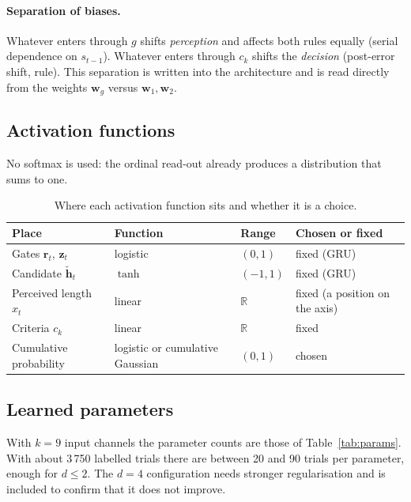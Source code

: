 \documentclass[11pt,a4paper]{article}
\newcommand{\vect}[1]{\bm{#1}}
\begin{document}
\paragraph{Separation of biases.} Whatever enters through $g$ shifts \emph{perception}
and affects both rules equally (serial dependence on $s_{t-1}$). Whatever enters
through $c_k$ shifts the \emph{decision} (post-error shift, rule). This separation is
written into the architecture and is read directly from the weights $\vect{w}_g$
versus $\vect{w}_1, \vect{w}_2$.

\subsection{Activation functions}

No softmax is used: the ordinal read-out already produces a distribution that sums to
one.

\begin{table}[H]
  \centering\small
  \caption{Where each activation function sits and whether it is a choice.}
  \begin{tabular}{llll}
    \toprule
    Place & Function & Range & Chosen or fixed \\
    \midrule
    Gates $\vect{r}_t$, $\vect{z}_t$ & logistic & $(0,1)$ & fixed (GRU) \\
    Candidate $\tilde{\vect{h}}_t$ & $\tanh$ & $(-1,1)$ & fixed (GRU) \\
    Perceived length $\hat x_t$ & linear & $\mathbb{R}$ & fixed (a position on the axis) \\
    Criteria $c_k$ & linear & $\mathbb{R}$ & fixed \\
    Cumulative probability & logistic or cumulative Gaussian & $(0,1)$ & chosen \\
    \bottomrule
  \end{tabular}
\end{table}

\subsection{Learned parameters}

With $k = 9$ input channels the parameter counts are those of
Table~\ref{tab:params}. With about 3\,750 labelled trials there are between 20 and 90
trials per parameter, enough for $d \le 2$. The $d = 4$ configuration needs stronger
regularisation and is included to confirm that it does not improve.
\end{document}
